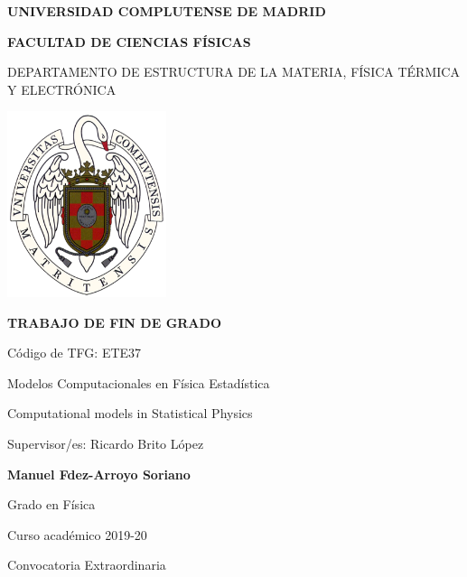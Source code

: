\documentclass[11pt, a4paper]{article} %
\theoremstyle{named}
\begin{document}
\begin{titlepage}
\centering
{ \bfseries \Large UNIVERSIDAD COMPLUTENSE DE MADRID}
\vspace{0.5cm}

{\bfseries  \Large FACULTAD DE CIENCIAS FÍSICAS}
\vspace{1cm}

{\large DEPARTAMENTO DE ESTRUCTURA DE LA MATERIA, FÍSICA TÉRMICA Y ELECTRÓNICA}
\vspace{0.8cm}

{\includegraphics[width=0.35\textwidth]{logo_UCM}} %
\vspace{0.8cm}

{\bfseries \Large TRABAJO DE FIN DE GRADO}
\vspace{2cm}

{\Large Código de TFG:  ETE37 } \vspace{5mm}

{\Large Modelos Computacionales en Física Estadística}\vspace{5mm}

{\Large Computational models in Statistical Physics}\vspace{5mm}

{\Large Supervisor/es: Ricardo Brito López}\vspace{20mm}

{\bfseries \LARGE Manuel Fdez-Arroyo Soriano}\vspace{5mm}

{\large Grado en Física}\vspace{5mm}

{\large Curso acad\'emico 2019-20}\vspace{5mm}

{\large Convocatoria Extraordinaria}\vspace{5mm}

\end{titlepage}
\newpage
\end{document}
